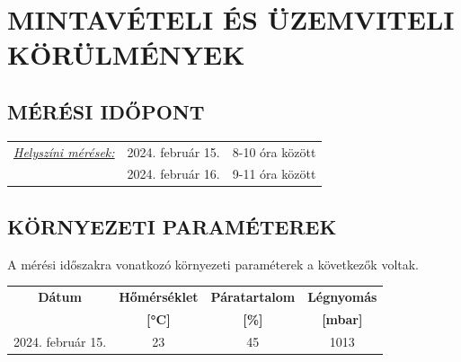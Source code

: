 \documentclass[a4paper,12pt]{article}
\renewcommand{\arraystretch}{0.5}
\begin{document}

	\newpage  %
	\section{MINTAVÉTELI ÉS ÜZEMVITELI KÖRÜLMÉNYEK}
	\subsection{MÉRÉSI IDŐPONT}
		\begin{adjustwidth}{1cm}{0cm}
			\begin{tabular}{ p{5.5cm} p{4cm} p{5cm}}
				\textit{\underline{Helyszíni mérések:}} & 2024. február 15. & 8-10 óra között \\& 2024. február 16. & 9-11 óra között \\
			\end{tabular}
			
		\end{adjustwidth}
	
	
	

	\subsection{KÖRNYEZETI PARAMÉTEREK}
		\begin{adjustwidth}{1cm}{0cm}
			A mérési időszakra vonatkozó környezeti paraméterek a következők voltak. \\
			\begin{table}[h]
				\centering
				\renewcommand{\arraystretch}{1.5}
				\begin{tabular}{|c|c|c|c|}
					\hline
					\textbf{Dátum} & \multicolumn{1}{c|}{\textbf{Hőmérséklet}} & \multicolumn{1}{c|}{\textbf{Páratartalom}} & \multicolumn{1}{c|}{\textbf{Légnyomás}} \\
					& \textbf{[°C]} & \textbf{[\%]} & \textbf{[mbar]} \\
					\hline
					2024. február 15. & 23 & 45 & 1013 \\
					\hline
				\end{tabular}\label{tab:table}
			\end{table}
			
			
		\end{adjustwidth}
	
\end{document}
